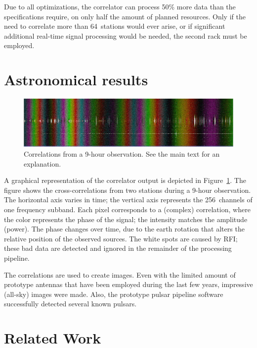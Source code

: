 \documentclass{sig-alternate}
\begin{document}
Due to all optimizations, the correlator can process 50\% more data than
the specifications require, on only half the amount of planned resources.
Only if the need to correlate more than 64~stations would ever arise, or if
significant additional real-time signal processing would be needed, the
second rack must be employed.


\section{Astronomical results}

\begin{figure}[ht]
\includegraphics[width=\columnwidth]{fringe.jpg}
\caption{Correlations from a 9-hour observation.  See the main text for
an explanation.}
\label{fig:fringe}
\end{figure}

A graphical representation of the correlator output is depicted in
Figure~\ref{fig:fringe}.
The figure shows the cross-correlations from two stations during a 9-hour
observation.
The horizontal axis varies in time;
the vertical axis represents the 256~channels of one frequency subband.
Each pixel corresponds to a (complex) correlation, where the color represents
the phase of the signal; the intensity matches the amplitude (power).
The phase changes over time, due to the earth rotation that alters the
relative position of the observed sources.
The white spots are caused by RFI; these bad data are detected and
ignored in the remainder of the processing pipeline.

The correlations are used to create images.
Even with the limited amount of prototype antennas that have been employed
during the last few years, impressive (all-sky) images were made.
Also, the prototype pulsar pipeline software successfully detected several
known pulsars.


\section{Related Work}
\label{sec:related-work}

\end{document}
